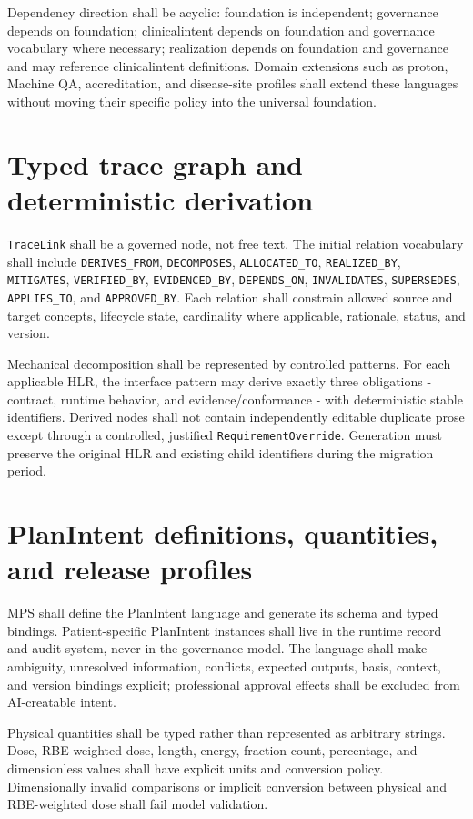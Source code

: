 \documentclass[11pt,letterpaper]{article}
\begin{document}
Dependency direction shall be acyclic: foundation is independent; governance depends on foundation; clinicalintent depends on foundation and governance vocabulary where necessary; realization depends on foundation and governance and may reference clinicalintent definitions. Domain extensions such as proton, Machine QA, accreditation, and disease-site profiles shall extend these languages without moving their specific policy into the universal foundation.

\section{Typed trace graph and deterministic derivation}

\texttt{TraceLink} shall be a governed node, not free text. The initial relation vocabulary shall include \texttt{DERIVES\_FROM}, \texttt{DECOMPOSES}, \texttt{ALLOCATED\_TO}, \texttt{REALIZED\_BY}, \texttt{MITIGATES}, \texttt{VERIFIED\_BY}, \texttt{EVIDENCED\_BY}, \texttt{DEPENDS\_ON}, \texttt{INVALIDATES}, \texttt{SUPERSEDES}, \texttt{APPLIES\_TO}, and \texttt{APPROVED\_BY}. Each relation shall constrain allowed source and target concepts, lifecycle state, cardinality where applicable, rationale, status, and version.

Mechanical decomposition shall be represented by controlled patterns. For each applicable HLR, the interface pattern may derive exactly three obligations - contract, runtime behavior, and evidence/conformance - with deterministic stable identifiers. Derived nodes shall not contain independently editable duplicate prose except through a controlled, justified \texttt{RequirementOverride}. Generation must preserve the original HLR and existing child identifiers during the migration period.

\section{PlanIntent definitions, quantities, and release profiles}

MPS shall define the PlanIntent language and generate its schema and typed bindings. Patient-specific PlanIntent instances shall live in the runtime record and audit system, never in the governance model. The language shall make ambiguity, unresolved information, conflicts, expected outputs, basis, context, and version bindings explicit; professional approval effects shall be excluded from AI-creatable intent.

Physical quantities shall be typed rather than represented as arbitrary strings. Dose, RBE-weighted dose, length, energy, fraction count, percentage, and dimensionless values shall have explicit units and conversion policy. Dimensionally invalid comparisons or implicit conversion between physical and RBE-weighted dose shall fail model validation.
\end{document}
